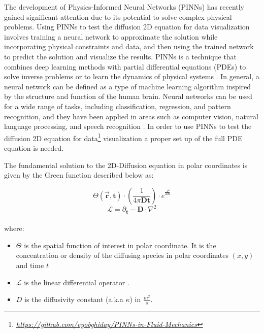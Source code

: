 \renewcommand{\thefootnote}{\alph{footnote}}
The development of Physics-Informed Neural Networks (PINNs) has recently gained significant attention due to its potential to solve complex physical problems. Using PINNs to test the diffusion 2D equation for data visualization involves training a neural network to approximate the solution while incorporating physical constraints and data, and then using the trained network to predict the solution and visualize the results. PINNs is a technique that combines deep learning methods with partial differential equations (PDEs) to solve inverse problems or to learn the dynamics of physical systems \cite{FernandezdelaMata2023}. In general, a neural network can be defined as a type of machine learning algorithm inspired by the structure and function of the human brain. Neural networks can be used for a wide range of tasks, including classification, regression, and pattern recognition, and they have been applied in areas such as computer vision, natural language processing, and speech recognition \cite{Katsnelson2023}. In order to use PINNs to test the diffusion 2D equation for data\footnote{\textit{\href{https://github.com/eyobghiday/PINNs-in-Fluid-Mechanics}{https://github.com/eyobghiday/PINNs-in-Fluid-Mechanics}}} visualization a proper set up of the full PDE equation is needed.

The fundamental solution to the 2D-Diffusion equation in polar coordinates is given by the Green function described below as:


 $$\Theta(\vec{\textbf{r}},\textbf{t})\cdot \left( \frac{1}{4 \pi \textbf{D} \textbf{t}} \right) \cdot e^{ ^ \frac{-\textbf{r}^2}{4 \textbf{D} \textbf{t}}}$$
$$ \textbf{$\mathcal{L}$} = \partial_\textbf{t}-\textbf{D}\cdot\nabla^2$$
\\
where$:$
\begin{itemize}[noitemsep]
\item $\Theta$ is the spatial function of interest in polar coordinate. It is the concentration or density of the diffusing species in polar coordinates $(x,y)$ and time $t$
\item $\mathcal{L}$ is the linear differential operator \cite{Skinner}\cite{Nair2011}.
\item $D$ is the diffusivity constant (a.k.a $\kappa$) in $\frac{m^2}{s}$.
\end{itemize}

